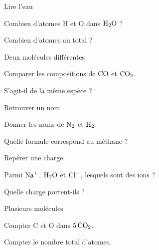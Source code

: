 \par\noindent\begin{minipage}{\linewidth}
\begin{exercice}[1]{Lire l’eau}
\begin{questions}
\item Combien d’atomes H et O dans $\ce{H2O}$ ?
\item Combien d’atomes au total ?
\end{questions}
\end{exercice}
\end{minipage}
\par\noindent\begin{minipage}{\linewidth}
\begin{exercice}[1]{Deux molécules différentes}
\begin{questions}
\item Comparer les compositions de $\ce{CO}$ et $\ce{CO2}$.
\item S’agit-il de la même espèce ?
\end{questions}
\end{exercice}
\end{minipage}
\par\noindent\begin{minipage}{\linewidth}
\begin{exercice}[1]{Retrouver un nom}
\begin{questions}
\item Donner les noms de $\ce{N2}$ et $\ce{H2}$.
\item Quelle formule correspond au méthane ?
\end{questions}
\end{exercice}
\end{minipage}
\par\noindent\begin{minipage}{\linewidth}
\begin{exercice}[1]{Repérer une charge}
\begin{questions}
\item Parmi $\ce{Na+}$, $\ce{H2O}$ et $\ce{Cl-}$, lesquels sont des ions ?
\item Quelle charge portent-ils ?
\end{questions}
\end{exercice}
\end{minipage}
\clearpage{}
\par\noindent\begin{minipage}{\linewidth}
\begin{exercice}[2]{Plusieurs molécules}
\begin{questions}
\item Compter C et O dans $5\,\ce{CO2}$.
\item Compter le nombre total d’atomes.
\end{questions}
\end{exercice}
\end{minipage}

